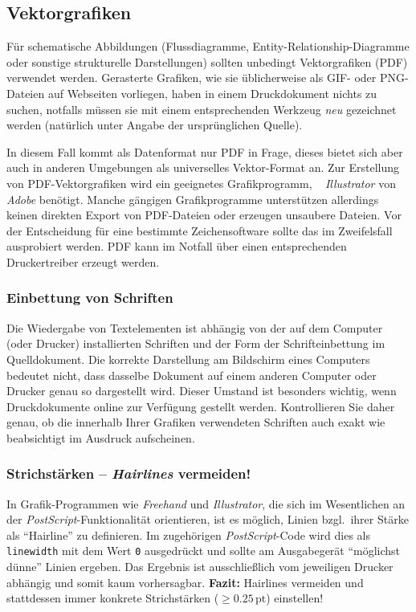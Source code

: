 \subsection{Vektorgrafiken}

Für schematische Abbildungen (\zB Flussdiagramme, Entity-Relationship-Diagramme
oder sonstige strukturelle Darstellungen) sollten unbedingt
Vektorgrafiken (PDF) verwendet werden. %
Gerasterte Grafiken, wie sie üblicherweise als GIF- oder PNG-Dateien
auf Webseiten vorliegen, haben in einem Druckdokument nichts zu suchen, notfalls
müssen sie mit einem entsprechenden Werkzeug \emph{neu} gezeichnet werden (natürlich
unter Angabe der ursprünglichen Quelle).

In diesem Fall kommt als Datenformat nur PDF %
in Frage,
dieses bietet sich aber auch in anderen Umgebungen als universelles
Vektor-Format an.
Zur Erstellung von PDF-Vektorgrafiken wird ein geeignetes
Grafikprogramm, \zB\ %
\emph{Illustrator} von \emph{Adobe} benötigt.
Manche gängigen Grafikprogramme 
unterstützen allerdings keinen direkten Export von PDF-Dateien
oder erzeugen unsaubere Dateien. Vor der Entscheidung
für eine bestimmte Zeichensoftware sollte das im Zweifelsfall
ausprobiert werden.
PDF kann im Notfall über einen entsprechenden Druckertreiber erzeugt werden.


\subsubsection{Einbettung von Schriften}

Die Wiedergabe von Textelementen ist abhängig von der auf dem
Computer (oder Drucker) installierten Schriften und der Form der
Schrifteinbettung im Quelldokument. Die korrekte Darstellung am
Bildschirm eines Computers bedeutet nicht, dass dasselbe Dokument
auf einem anderen Computer oder Drucker genau so dargestellt wird.
Dieser Umstand ist besonders wichtig, wenn Druckdokumente online
zur Verfügung gestellt werden. Kontrollieren Sie daher genau, ob
die innerhalb Ihrer Grafiken verwendeten Schriften auch exakt wie
beabsichtigt im Ausdruck aufscheinen.


\subsubsection{Strichstärken -- \emph{Hairlines} vermeiden!}

In Grafik-Programmen wie \emph{Freehand} und \emph{Illustrator},
die sich im Wesentlichen an der \emph{PostScript}-Funktionalität
orientieren, ist es möglich, Linien bzgl.\ ihrer Stärke als
"`Hairline"' zu definieren. Im zugehörigen \emph{PostScript}-Code
wird dies als \texttt{linewidth} mit dem Wert \texttt{0} ausgedrückt und
sollte am Ausgabegerät "`möglichst dünne"' Linien ergeben. 
Das Ergebnis ist ausschließlich vom jeweiligen Drucker
abhängig und somit kaum vorhersagbar.
\textbf{Fazit:} Hairlines vermeiden und stattdessen immer konkrete
Strichstärken ($\geq 0.25\,\mathrm{pt}$) einstellen!





